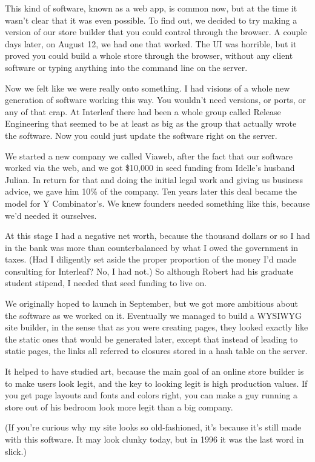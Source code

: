 \documentclass[12pt]{book}
\begin{document}
This kind of software, known as a web app, is common now, but at the
time it wasn't clear that it was even possible. To find out, we decided
to try making a version of our store builder that you could control
through the browser. A couple days later, on August 12, we had one that
worked. The UI was horrible, but it proved you could build a whole store
through the browser, without any client software or typing anything into
the command line on the server.

Now we felt like we were really onto something. I had visions of a whole
new generation of software working this way. You wouldn't need versions,
or ports, or any of that crap. At Interleaf there had been a whole group
called Release Engineering that seemed to be at least as big as the
group that actually wrote the software. Now you could just update the
software right on the server.

We started a new company we called Viaweb, after the fact that our
software worked via the web, and we got \$10,000 in seed funding from
Idelle's husband Julian. In return for that and doing the initial legal
work and giving us business advice, we gave him 10\% of the company. Ten
years later this deal became the model for Y Combinator's. We knew
founders needed something like this, because we'd needed it ourselves.

At this stage I had a negative net worth, because the thousand dollars
or so I had in the bank was more than counterbalanced by what I owed the
government in taxes. (Had I diligently set aside the proper proportion
of the money I'd made consulting for Interleaf? No, I had not.) So
although Robert had his graduate student stipend, I needed that seed
funding to live on.

We originally hoped to launch in September, but we got more ambitious
about the software as we worked on it. Eventually we managed to build a
WYSIWYG site builder, in the sense that as you were creating pages, they
looked exactly like the static ones that would be generated later,
except that instead of leading to static pages, the links all referred
to closures stored in a hash table on the server.

It helped to have studied art, because the main goal of an online store
builder is to make users look legit, and the key to looking legit is
high production values. If you get page layouts and fonts and colors
right, you can make a guy running a store out of his bedroom look more
legit than a big company.

(If you're curious why my site looks so old-fashioned, it's because it's
still made with this software. It may look clunky today, but in 1996 it
was the last word in slick.)
\end{document}
